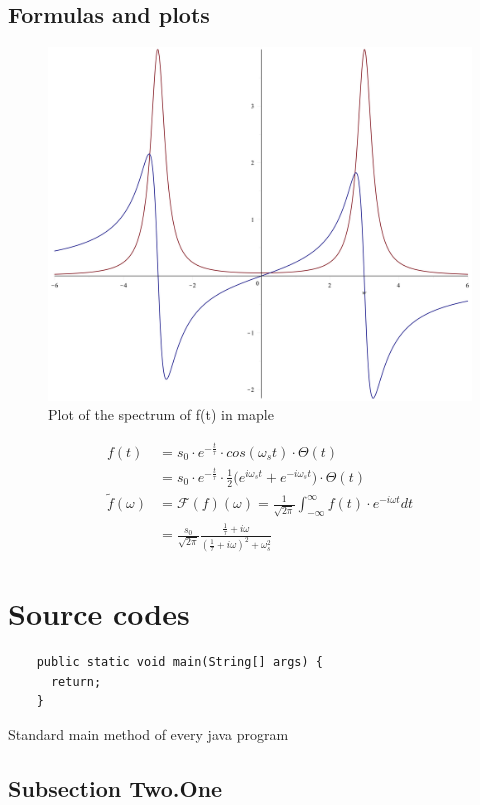 \subsection{Formulas and plots}
\lipsum[6]
\begin{figure}[h]
  \centering
  \includegraphics[width=\linewidth]{img/spectrum}
  \caption{Plot of the spectrum of f(t) in maple}
  \label{img:spectrum}
\end{figure}

\begin{align}
    f(t) &= s_0 \cdot e^{-\frac{t}{\tau}} \cdot cos(\omega_s t) \cdot \Theta(t) \nonumber \\
    &= s_0 \cdot e^{-\frac{t}{\tau}} \cdot \frac{1}{2} \Big( e^{i \omega_s t} + e^{-i \omega_s t} \Big) \cdot \Theta(t)\\
    \tilde{f}(\omega) &= \mathcal{F}(f)(\omega) = \frac{1}{\sqrt{2\pi}} \int_{-\infty}^{\infty} f(t) \cdot e^{-i \omega t} dt \nonumber\\
    &= \frac{s_0}{\sqrt{2\pi}} \frac{\frac{1}{\tau} + i \omega}{(\frac{1}{\tau} + i \omega)^2 + \omega_s^2}
\end{align}

\section{Source codes}
\begin{listing}
  \begin{verbatim}
    public static void main(String[] args) {
      return;
    }
  \end{verbatim}
  \caption{Standard main method of every java program}
  \label{lst:javamain}
\end{listing}

\lipsum[9-12]

\subsection{Subsection Two.One}
\lipsum[13-14]
